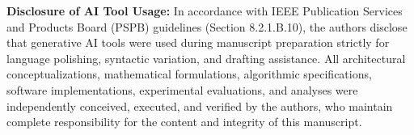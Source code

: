 \documentclass[conference]{IEEEtran}
\begin{document}
\noindent\textbf{Disclosure of AI Tool Usage:} In accordance with IEEE Publication Services and Products Board (PSPB) guidelines (Section 8.2.1.B.10), the authors disclose that generative AI tools were used during manuscript preparation strictly for language polishing, syntactic variation, and drafting assistance. All architectural conceptualizations, mathematical formulations, algorithmic specifications, software implementations, experimental evaluations, and analyses were independently conceived, executed, and verified by the authors, who maintain complete responsibility for the content and integrity of this manuscript.

\end{document}
